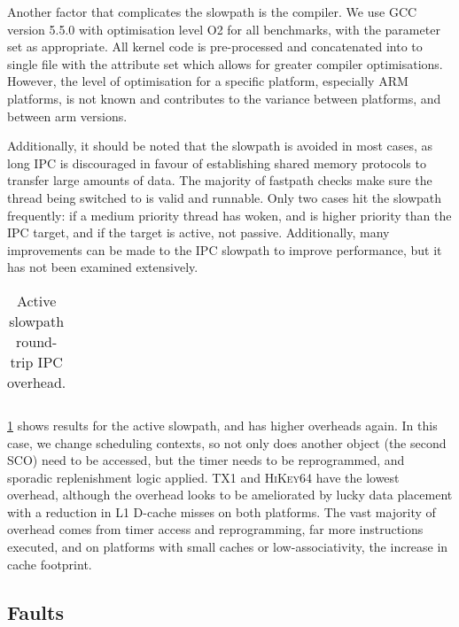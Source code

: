 Another factor that complicates the slowpath is the compiler. We use GCC version 5.5.0 with optimisation
level O2 for all benchmarks, with the  parameter set as appropriate. All kernel
code is pre-processed and concatenated into to single file with the  attribute
set which allows for greater compiler optimisations. However, the level of optimisation for a
specific platform, especially ARM platforms, is not known and contributes to the variance between
platforms, and between arm versions.

Additionally, it should be noted that the slowpath is avoided in most cases, as long IPC is discouraged in
favour of establishing shared memory protocols to transfer large amounts of data. The majority of
fastpath checks make sure the thread being switched to is valid and runnable. Only two cases hit the
slowpath frequently: if a medium priority thread has woken, and is higher priority than the
\gls{IPC} target, and if the target is active, not passive. 
Additionally, many improvements can be made to the \gls{IPC} slowpath to improve
performance, but it has not been examined extensively.

\begin{table}[t]\centering
    \begin{tabularx}{\textwidth}{Xlllllll}\toprule
        
        \bottomrule
    \end{tabularx}
\caption{Active slowpath round-trip IPC overhead.}
\label{t:slowpath-ipc-micro-active}
\end{table}


\cref{t:slowpath-ipc-micro-active} shows results for the active slowpath, and has higher overheads
again. In this case, we change scheduling
contexts, so not only does another object (the second \gls{SCO}) need to be accessed, but the timer
needs to be reprogrammed, and sporadic replenishment logic applied. \textsc{TX1} and
\textsc{HiKey64} have the lowest overhead, although the overhead looks to be ameliorated by lucky
data placement with a reduction in L1 D-cache misses on both platforms. The vast majority of
overhead comes from timer access and reprogramming, far more instructions executed, and on platforms
with small caches or low-associativity, the increase in cache footprint.  


\subsection{Faults}

